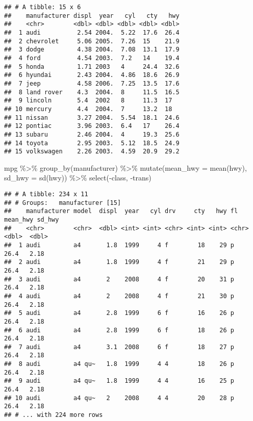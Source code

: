 \documentclass[
]{article}
\newenvironment{Shaded}{\begin{snugshade}}{\end{snugshade}}
\newcommand{\AttributeTok}[1]{\textcolor[rgb]{0.77,0.63,0.00}{#1}}
\newcommand{\FunctionTok}[1]{\textcolor[rgb]{0.00,0.00,0.00}{#1}}
\newcommand{\NormalTok}[1]{#1}
\newcommand{\SpecialCharTok}[1]{\textcolor[rgb]{0.00,0.00,0.00}{#1}}
\begin{document}
\begin{verbatim}
## # A tibble: 15 x 6
##    manufacturer displ  year   cyl   cty   hwy
##    <chr>        <dbl> <dbl> <dbl> <dbl> <dbl>
##  1 audi          2.54 2004.  5.22  17.6  26.4
##  2 chevrolet     5.06 2005.  7.26  15    21.9
##  3 dodge         4.38 2004.  7.08  13.1  17.9
##  4 ford          4.54 2003.  7.2   14    19.4
##  5 honda         1.71 2003   4     24.4  32.6
##  6 hyundai       2.43 2004.  4.86  18.6  26.9
##  7 jeep          4.58 2006.  7.25  13.5  17.6
##  8 land rover    4.3  2004.  8     11.5  16.5
##  9 lincoln       5.4  2002   8     11.3  17  
## 10 mercury       4.4  2004.  7     13.2  18  
## 11 nissan        3.27 2004.  5.54  18.1  24.6
## 12 pontiac       3.96 2003.  6.4   17    26.4
## 13 subaru        2.46 2004.  4     19.3  25.6
## 14 toyota        2.95 2003.  5.12  18.5  24.9
## 15 volkswagen    2.26 2003.  4.59  20.9  29.2
\end{verbatim}

\begin{Shaded}
\begin{Highlighting}[]
\NormalTok{mpg }\SpecialCharTok{\%\textgreater{}\%}
  \FunctionTok{group\_by}\NormalTok{(manufacturer) }\SpecialCharTok{\%\textgreater{}\%}
  \FunctionTok{mutate}\NormalTok{(}\AttributeTok{mean\_hwy =} \FunctionTok{mean}\NormalTok{(hwy), }\AttributeTok{sd\_hwy =} \FunctionTok{sd}\NormalTok{(hwy)) }\SpecialCharTok{\%\textgreater{}\%}
  \FunctionTok{select}\NormalTok{(}\SpecialCharTok{{-}}\NormalTok{class, }\SpecialCharTok{{-}}\NormalTok{trans)}
\end{Highlighting}
\end{Shaded}

\begin{verbatim}
## # A tibble: 234 x 11
## # Groups:   manufacturer [15]
##    manufacturer model  displ  year   cyl drv     cty   hwy fl    mean_hwy sd_hwy
##    <chr>        <chr>  <dbl> <int> <int> <chr> <int> <int> <chr>    <dbl>  <dbl>
##  1 audi         a4       1.8  1999     4 f        18    29 p         26.4   2.18
##  2 audi         a4       1.8  1999     4 f        21    29 p         26.4   2.18
##  3 audi         a4       2    2008     4 f        20    31 p         26.4   2.18
##  4 audi         a4       2    2008     4 f        21    30 p         26.4   2.18
##  5 audi         a4       2.8  1999     6 f        16    26 p         26.4   2.18
##  6 audi         a4       2.8  1999     6 f        18    26 p         26.4   2.18
##  7 audi         a4       3.1  2008     6 f        18    27 p         26.4   2.18
##  8 audi         a4 qu~   1.8  1999     4 4        18    26 p         26.4   2.18
##  9 audi         a4 qu~   1.8  1999     4 4        16    25 p         26.4   2.18
## 10 audi         a4 qu~   2    2008     4 4        20    28 p         26.4   2.18
## # ... with 224 more rows
\end{verbatim}
\end{document}
